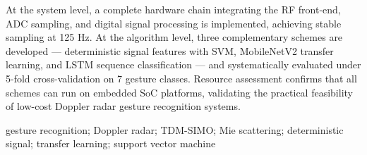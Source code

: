At the system level, a complete hardware chain integrating the RF front-end, ADC sampling, and digital signal processing is implemented, achieving stable sampling at 125 Hz. At the algorithm level, three complementary schemes are developed --- deterministic signal features with SVM, MobileNetV2 transfer learning, and LSTM sequence classification --- and systematically evaluated under 5-fold cross-validation on 7 gesture classes. Resource assessment confirms that all schemes can run on embedded SoC platforms, validating the practical feasibility of low-cost Doppler radar gesture recognition systems.

gesture recognition; Doppler radar; TDM-SIMO; Mie scattering; deterministic signal; transfer learning; support vector machine